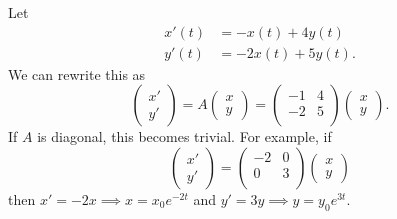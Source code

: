 \begin{example}
    Let
    \begin{align*}
        x'(t) &= -x(t) + 4y(t) \\
        y'(t) &= -2x(t) + 5y(t).
    \end{align*}
    We can rewrite this as 
    \[
        \begin{pmatrix}
            x' \\ y'
        \end{pmatrix}
        =
        A
        \begin{pmatrix}
            x \\ y
        \end{pmatrix}
        =
        \begin{pmatrix}
            -1 & 4 \\
            -2 & 5 \\
        \end{pmatrix}
        \begin{pmatrix}
            x \\ y
        \end{pmatrix}
        .
    \]
    If $A$ is diagonal, this becomes trivial. For example, if
    \[
        \begin{pmatrix}
            x' \\ y'
        \end{pmatrix}
        =
        \begin{pmatrix}
            -2 & 0 \\
            0 & 3 \\
        \end{pmatrix}
        \begin{pmatrix}
            x \\ y
        \end{pmatrix}
    \]
    then $x' = -2x \implies x = x_0 e^{-2t}$ and $y' = 3y \implies y = y_0 e^{3t}$.
\end{example}

